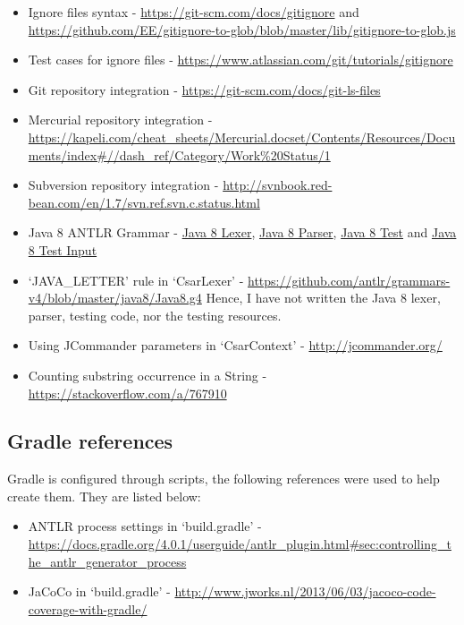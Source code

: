 \documentclass[12pt, letterpaper]{article}
\begin{document}
\begin{itemize}
  \item Ignore files syntax - \url{https://git-scm.com/docs/gitignore} and \url{https://github.com/EE/gitignore-to-glob/blob/master/lib/gitignore-to-glob.js}
  \item Test cases for ignore files - \url{https://www.atlassian.com/git/tutorials/gitignore}
  \item Git repository integration - \url{https://git-scm.com/docs/git-ls-files}
  \item Mercurial repository integration - \url{https://kapeli.com/cheat_sheets/Mercurial.docset/Contents/Resources/Documents/index#//dash_ref/Category/Work%20Status/1}
  \item Subversion repository integration - \url{http://svnbook.red-bean.com/en/1.7/svn.ref.svn.c.status.html}
  \item Java 8 ANTLR Grammar - \href{https://github.com/antlr/grammars-v4/blob/02711067f82bed8e0c8dfd25e80f4f8ae2472abd/java8-pt/JavaLexer.g4}{Java 8 Lexer}, \href{https://github.com/antlr/grammars-v4/blob/02711067f82bed8e0c8dfd25e80f4f8ae2472abd/java8-pt/JavaParser.g4}{Java 8 Parser}, \href{https://github.com/antlr/grammars-v4/blob/02711067f82bed8e0c8dfd25e80f4f8ae2472abd/_grammar-test/src/test/java/TestJava8pt.java}{Java 8 Test} and \href{https://github.com/antlr/grammars-v4/blob/02711067f82bed8e0c8dfd25e80f4f8ae2472abd/java8-pt/examples/AllInOne8.java}{Java 8 Test Input}
  \item `JAVA\_LETTER' rule in `CsarLexer' - \url{https://github.com/antlr/grammars-v4/blob/master/java8/Java8.g4}
  Hence, I have not written the Java 8 lexer, parser, testing code, nor the testing resources.
  \item Using JCommander parameters in `CsarContext' - \url{http://jcommander.org/}
  \item Counting substring occurrence in a String - \url{https://stackoverflow.com/a/767910}
\end{itemize}

\subsection{Gradle references}
Gradle is configured through scripts, the following references were used to help create them. They are listed below:

\begin{itemize}
  \item ANTLR process settings in `build.gradle' - \url{https://docs.gradle.org/4.0.1/userguide/antlr\_plugin.html\#sec:controlling\_the\_antlr\_generator\_process}
  \item JaCoCo in `build.gradle' - \url{http://www.jworks.nl/2013/06/03/jacoco-code-coverage-with-gradle/}
\end{itemize}
\end{document}
